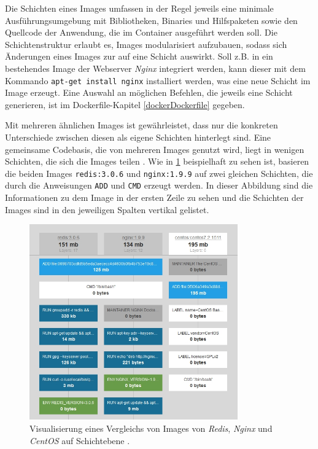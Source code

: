 \documentclass[../main.tex]{subfiles}
\begin{document}
      Die Schichten eines Images umfassen in der Regel jeweils eine minimale Ausführungsumgebung mit Bibliotheken, Binaries und Hilfspaketen sowie den Quellcode der Anwendung, die im Container ausgeführt werden soll. Die Schichtenstruktur erlaubt es, Images modularisiert aufzubauen, sodass sich Änderungen eines Images zur auf eine Schicht auswirkt. Soll z.B. in ein bestehendes Image der Webserver \emph{Nginx} integriert werden, kann dieser mit dem Kommando \texttt{apt-get install nginx} installiert werden, was eine neue Schicht im Image erzeugt. Eine Auswahl an möglichen Befehlen, die jeweils eine Schicht generieren, ist im Dockerfile-Kapitel \ref{dockerDockerfile} gegeben.

			Mit mehreren ähnlichen Images ist gewährleistet, dass nur die konkreten Unterschiede zwischen diesen als eigene Schichten hinterlegt sind. Eine gemeinsame Codebasis, die von mehreren Images genutzt wird, liegt in wenigen Schichten, die sich die Images teilen \cite[S.3]{dockerIntroIEEE}. Wie in \fig \ref{fig:intro_imagelayers} beispielhaft zu sehen ist, basieren die beiden Images \texttt{redis:3.0.6} und \texttt{nginx:1.9.9} auf zwei gleichen Schichten, die durch die Anweisungen \texttt{ADD} und \texttt{CMD} erzeugt werden. In dieser Abbildung sind die Informationen zu dem Image in der ersten Zeile zu sehen und die Schichten der Images sind in den jeweiligen Spalten vertikal gelistet.

			\begin{figure}[!htbp]
          \centering
          \includegraphics[width=0.8\textwidth]{./images/intro_imagelayers.jpg}
          \caption{Visualisierung eines Vergleichs von Images von \emph{Redis}, \emph{Nginx} und \emph{CentOS} auf Schichtebene \cite{dockerImagelayers}.}
          \label{fig:intro_imagelayers}
      \end{figure}
\end{document}
